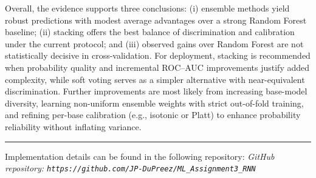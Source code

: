 \documentclass[conference]{IEEEtran}
\begin{document}
Overall, the evidence supports three conclusions: (i) ensemble methods yield robust predictions with modest average advantages over a strong Random Forest baseline; (ii) stacking offers the best balance of discrimination and calibration under the current protocol; and (iii) observed gains over Random Forest are not statistically decisive in cross-validation. For deployment, stacking is recommended when probability quality and incremental ROC--AUC improvements justify added complexity, while soft voting serves as a simpler alternative with near-equivalent discrimination. Further improvements are most likely from increasing base-model diversity, learning non-uniform ensemble weights with strict out-of-fold training, and refining per-base calibration (e.g., isotonic or Platt) to enhance probability reliability without inflating variance.







\hrule
\vspace{5mm}
Implementation details can be found in the following repository:
\textit{GitHub repository: \nolinkurl{https://github.com/JP-DuPreez/ML_Assignment3_RNN}}

\onecolumn
\end{document}
